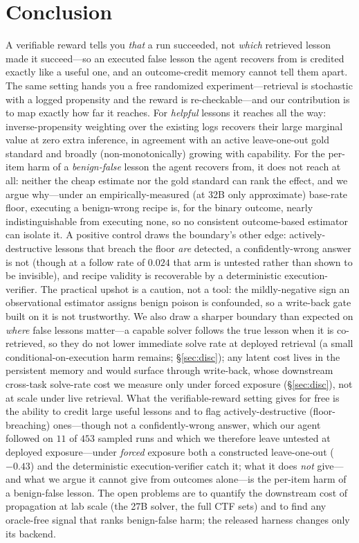 \documentclass[10pt,twocolumn]{article}
\begin{document}
\section{Conclusion}
A verifiable reward tells you \emph{that} a run succeeded, not \emph{which} retrieved
lesson made it succeed---so an executed false lesson the agent recovers from is credited
exactly like a useful one, and an outcome-credit memory cannot tell them apart. The same
setting hands you a free randomized experiment---retrieval is stochastic with a logged
propensity and the reward is re-checkable---and our contribution is to map exactly how
far it reaches. For \emph{helpful} lessons it reaches all the way: inverse-propensity
weighting over the existing logs recovers their large marginal value at zero extra
inference, in agreement with an active leave-one-out gold standard and broadly
(non-monotonically) growing with capability. For the per-item harm of a
\emph{benign-false} lesson the agent recovers
from, it does not reach at all: neither the cheap estimate nor the gold standard can
rank the effect, and we argue why---under an empirically-measured (at 32B only
approximate) base-rate floor, executing a benign-wrong recipe is, for the binary
outcome, nearly indistinguishable from executing none, so no consistent outcome-based
estimator can isolate it. A positive control draws
the boundary's other edge: actively-destructive lessons that breach the floor \emph{are}
detected, a confidently-wrong answer is not (though at a follow rate of $0.024$ that arm
is untested rather than shown to be invisible), and recipe validity is recoverable by a
deterministic execution-verifier. The practical upshot is a caution, not a tool: the
mildly-negative sign an observational estimator assigns benign poison is confounded, so a
write-back gate built on it is not trustworthy. We also draw a sharper boundary than
expected on \emph{where} false lessons matter---a capable solver follows the true lesson
when it is co-retrieved, so they do not lower immediate solve rate at deployed retrieval
(a small conditional-on-execution harm remains; \S\ref{sec:disc}); any latent cost lives
in the persistent memory and would surface through write-back, whose downstream
cross-task solve-rate cost we measure only under forced exposure (\S\ref{sec:disc}), not
at scale under live retrieval. What the verifiable-reward setting gives
for free is the ability to credit large useful lessons and to flag actively-destructive
(floor-breaching) ones---though not a confidently-wrong answer, which our agent
followed on $11$ of $453$ sampled runs and which we therefore leave untested at deployed
exposure---under \emph{forced} exposure both a constructed leave-one-out ($-0.43$) and
the deterministic execution-verifier catch it; what it does \emph{not} give---and what we argue it cannot
give from outcomes alone---is the per-item harm of a benign-false lesson. The open problems are to quantify
the downstream cost of propagation at lab scale (the 27B solver, the full CTF sets) and
to find any oracle-free signal that ranks benign-false harm; the released harness changes
only its backend.
\end{document}
